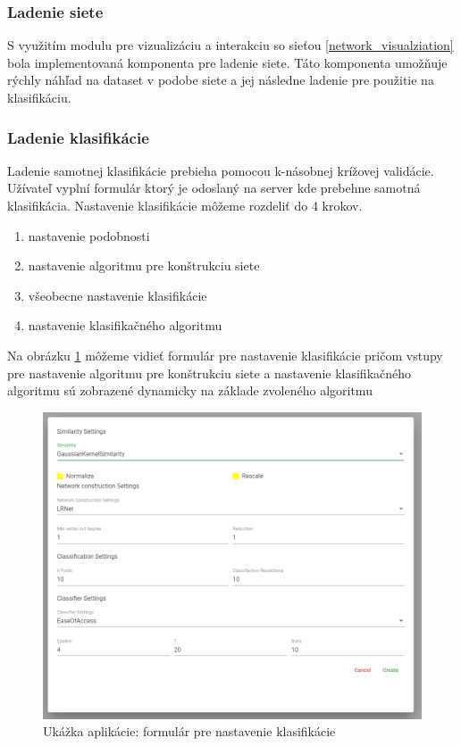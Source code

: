 \documentclass[slovak,master,dept460,male,cpp,cpdeclaration]{diploma}
\begin{document}
\subsubsection{Ladenie siete}
S využitím modulu pre vizualizáciu a interakciu so sieťou  \ref{network_visualziation} bola implementovaná komponenta pre ladenie siete.
Táto komponenta umožňuje rýchly náhľad na dataset v podobe siete a jej následne ladenie pre použitie na klasifikáciu.


\subsubsection{Ladenie klasifikácie}
Ladenie samotnej klasifikácie prebieha pomocou k-násobnej krížovej validácie. Užívateľ vyplní formulár ktorý je odoslaný na server kde prebehne samotná klasifikácia. Nastavenie klasifikácie môžeme rozdeliť do 4 krokov.
\begin{enumerate}
\item nastavenie podobnosti
\item nastavenie algoritmu pre konštrukciu siete
\item všeobecne nastavenie klasifikácie 
\item nastavenie klasifikačného algoritmu
\end{enumerate}
Na obrázku \ref{pic:classification_settings} môžeme vidieť formulár pre nastavenie klasifikácie pričom vstupy pre nastavenie algoritmu pre konštrukciu siete a nastavenie klasifikačného algoritmu sú zobrazené dynamicky na základe zvoleného algoritmu
\begin{figure}[H]
\centering
\includegraphics[width=\textwidth]{classification_settings.PNG}
\caption{Ukážka aplikácie: formulár pre nastavenie klasifikácie}
\label{pic:classification_settings}
\end{figure}  \\
\end{document}
